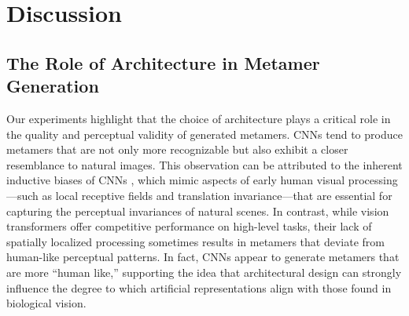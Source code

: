 \documentclass[pdflatex,sn-mathphys-num]{sn-jnl}%
\theoremstyle{thmstyleone}%
\theoremstyle{thmstyletwo}%
\theoremstyle{thmstylethree}%
\begin{document}

\section{Discussion}

\subsection{The Role of Architecture in Metamer Generation}
Our experiments highlight that the choice of architecture plays a critical role in the quality and perceptual validity of generated metamers. CNNs tend to produce metamers that are not only more recognizable but also exhibit a closer resemblance to natural images. This observation can be attributed to the inherent inductive biases of CNNs \cite{wang2023theoretical}, which mimic aspects of early human visual processing—such as local receptive fields and translation invariance—that are essential for capturing the perceptual invariances of natural scenes. In contrast, while vision transformers offer competitive performance on high-level tasks, their lack of spatially localized processing sometimes results in metamers that deviate from human-like perceptual patterns. In fact, CNNs appear to generate metamers that are more “human like,” supporting the idea that architectural design can strongly influence the degree to which artificial representations align with those found in biological vision.
\end{document}
